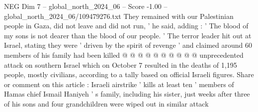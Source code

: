 \begin{textsample}{NEG Dim 7 – global\_north\_2024\_06 – Score -1.00 – global\_north\_2024\_06/109479276.txt}
They remained with our Palestinian people in Gaza, did not leave and did not run, ' he said, adding : ' The blood of my sons is not dearer than the blood of our people. ' The terror leader hit out at Israel, stating they were ' driven by the spirit of revenge ' and claimed around 60 members of his family had been killed @ @ @ @ @ @ @ @ @ @ unprecedented attack on southern Israel which on October 7 resulted in the deaths of 1,195 people, mostly civilians, according to a tally based on official Israeli figures.
Share or comment on this article : Israeli airstrike ' kills at least ten ' members of Hamas chief Ismail Haniyeh ' s family, including his sister, just weeks after three of his sons and four grandchildren were wiped out in similar attack

\end{textsample}
